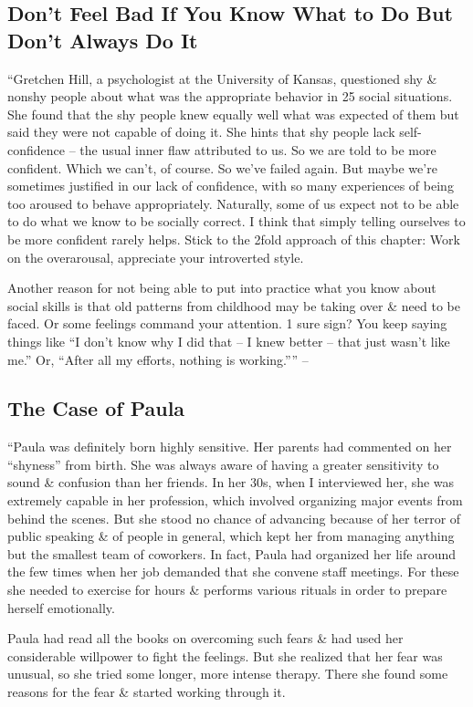 \documentclass{article}
\numberwithin{equation}{section}
\begin{document}
\subsection{Don't Feel Bad If You Know What to Do But Don't Always Do It}
``Gretchen Hill, a psychologist at the University of Kansas, questioned shy \& nonshy people about what was the appropriate behavior in 25 social situations. She found that the shy people knew equally well what was expected of them but said they were not capable of doing it. She hints that shy people lack self-confidence -- the usual inner flaw attributed to us. So we are told to be more confident. Which we can't, of course. So we've failed again. But maybe we're sometimes justified in our lack of confidence, with so many experiences of being too aroused to behave appropriately. Naturally, some of us expect not to be able to do what we know to be socially correct. I think that simply telling ourselves to be more confident rarely helps. Stick to the 2fold approach of this chapter: Work on the overarousal, appreciate your introverted style.

Another reason for not being able to put into practice what you know about social skills is that old patterns from childhood may be taking over \& need to be faced. Or some feelings command your attention. 1 sure sign? You keep saying things like ``I don't know why I did that -- I knew better -- that just wasn't like me.'' Or, ``After all my efforts, nothing is working.'''' -- \cite[pp. 137--138]{Aron2013}

\subsection{The Case of Paula}
``Paula was definitely born highly sensitive. Her parents had commented on her ``shyness'' from birth. She was always aware of having a greater sensitivity to sound \& confusion than her friends. In her 30s, when I interviewed her, she was extremely capable in her profession, which involved organizing major events from behind the scenes. But she stood no chance of advancing because of her terror of public speaking \& of people in general, which kept her from managing anything but the smallest team of coworkers. In fact, Paula had organized her life around the few times when her job demanded that she convene staff meetings. For these she needed to exercise for hours \& performs various rituals in order to prepare herself emotionally.

Paula had read all the books on overcoming such fears \& had used her considerable willpower to fight the feelings. But she realized that her fear was unusual, so she tried some longer, more intense therapy. There she found some reasons for the fear \& started working through it.
\end{document}
